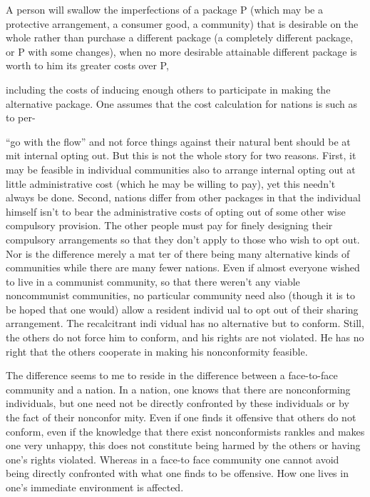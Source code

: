\documentclass[11pt,openany]{book}
\begin{document}
A person will swallow the imperfections of a package P (which may be a protective arrangement, a consumer good, a community) that is desirable on the whole rather than purchase a different package (a completely different package, or P with some changes), when no more desirable attainable different package is worth to him its greater costs over P, 

including the costs of inducing enough others to participate in making the alternative package. One assumes that the cost calculation for nations is such as to per-

``go with the flow'' and not force things against their natural bent should be at mit internal opting out. But this is not the whole story for two reasons. First, it may be feasible in individual communities also to arrange internal opting out at little administrative cost (which he may be willing to pay), yet this needn't always be done. Second, nations differ from other packages in that the individual himself isn't to bear the administrative costs of opting out of some other wise compulsory provision. The other people must pay for finely designing their compulsory arrangements so that they don't apply to those who wish to opt out. Nor is the difference merely a mat ter of there being many alternative kinds of communities while there are many fewer nations. Even if almost everyone wished to live in a communist community, so that there weren't any viable noncommunist communities, no particular community need also (though it is to be hoped that one would) allow a resident individ ual to opt out of their sharing arrangement. The recalcitrant indi vidual has no alternative but to conform. Still, the others do not force him to conform, and his rights are not violated. He has no right that the others cooperate in making his nonconformity feasible. 

The difference seems to me to reside in the difference between a face-to-face community and a nation. In a nation, one knows that there are nonconforming individuals, but one need not be directly confronted by these individuals or by the fact of their nonconfor mity. Even if one finds it offensive that others do not conform, even if the knowledge that there exist nonconformists rankles and makes one very unhappy, this does not constitute being harmed by the others or having one's rights violated. Whereas in a face-to face community one cannot avoid being directly confronted with what one finds to be offensive. How one lives in one's immediate environment is affected. 
\end{document}
